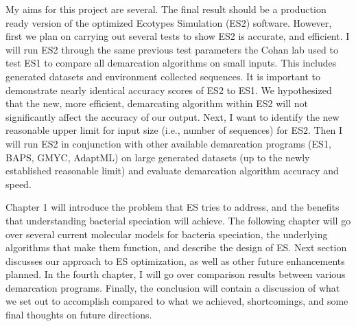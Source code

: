 My aims for this project are several.
The final result should be a production ready version of the optimized Ecotypes Simulation (ES2) software.
However, first we plan on carrying out several tests to show ES2 is accurate, and efficient.
I will run ES2 through the same previous test parameters the Cohan lab used to test ES1 to compare all demarcation algorithms on small inputs.
This includes generated datasets and environment collected sequences.
It is important to demonstrate nearly identical accuracy scores of ES2 to ES1.
We hypothesized that the new, more efficient, demarcating algorithm within ES2 will not significantly affect the accuracy of our output.
Next, I want to identify the new reasonable upper limit for input size (i.e., number of sequences) for ES2.
Then I will run ES2 in conjunction with other available demarcation programs (ES1, BAPS, GMYC, AdaptML) on large generated datasets (up to the newly established reasonable limit) and evaluate demarcation algorithm accuracy and speed.

Chapter 1 will introduce the problem that ES tries to address, and the benefits that understanding bacterial speciation will achieve.
The following chapter will go over several current molecular models for bacteria speciation, the underlying algorithms that make them function, and describe the design of ES.
Next section discusses our approach to ES optimization, as well as other future enhancements planned.
In the fourth chapter, I will go over comparison results between various demarcation programs.
Finally, the conclusion will contain a discussion of what we set out to accomplish compared to what we achieved, shortcomings, and some final thoughts on future directions.

